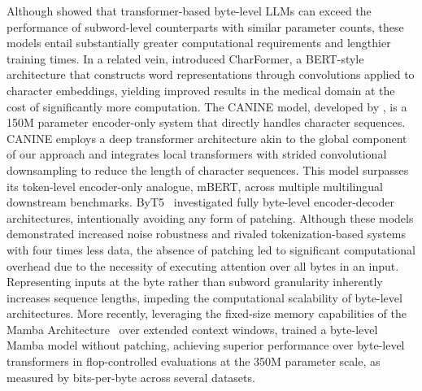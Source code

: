 Although \cite{Choe2019BridgingTG} showed that transformer-based byte-level LLMs can exceed the performance of subword-level counterparts with similar parameter counts, these models entail substantially greater computational requirements and lengthier training times. In a related vein, \cite{el2020characterbert} introduced CharFormer, a BERT-style architecture that constructs word representations through convolutions applied to character embeddings, yielding improved results in the medical domain at the cost of significantly more computation. The CANINE model, developed by \cite{clark2022canine}, is a 150M parameter encoder-only system that directly handles character sequences. CANINE employs a deep transformer architecture akin to the global component of our approach and integrates local transformers with strided convolutional downsampling to reduce the length of character sequences. This model surpasses its token-level encoder-only analogue, mBERT, across multiple multilingual downstream benchmarks. ByT5~\citep{xue2022byt5} investigated fully byte-level encoder-decoder architectures, intentionally avoiding any form of patching. Although these models demonstrated increased noise robustness and rivaled tokenization-based systems with four times less data, the absence of patching led to significant computational overhead due to the necessity of executing attention over all bytes in an input. Representing inputs at the byte rather than subword granularity inherently increases sequence lengths, impeding the computational scalability of byte-level architectures. More recently, leveraging the fixed-size memory capabilities of the Mamba Architecture~\citep{gu2023mamba} over extended context windows, \cite{wang2024mambabyte} trained a byte-level Mamba model without patching, achieving superior performance over byte-level transformers in flop-controlled evaluations at the 350M parameter scale, as measured by bits-per-byte across several datasets.

